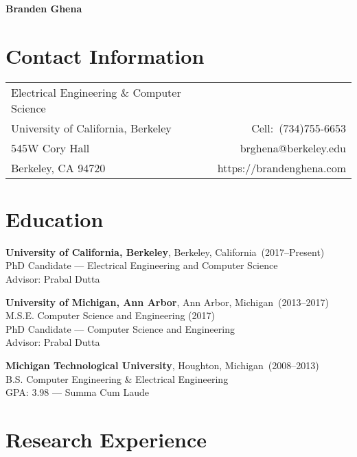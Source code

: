 \documentclass{article}
\begin{document}

\nocite{*}

\begin{center}
    \Huge{\bf{Branden Ghena}}
\end{center}

\section*{Contact Information}

\begin{table}[H]
\centering
\vspace*{-16pt}
\begin{tabularx}{\linewidth}{@{} X r @{}}
    {Electrical Engineering \& Computer Science}     & {} \\
    {University of California, Berkeley}   & {Cell:~(734)755-6653} \\
    {545W Cory Hall} & {brghena@berkeley.edu} \\
    {Berkeley, CA 94720} & {https://brandenghena.com} \\
\end{tabularx}
\end{table}


\section*{Education}
\vspace{-6pt}

{\bf University of California, Berkeley}, Berkeley, California~(2017--Present) \\
PhD Candidate --- Electrical Engineering and Computer Science \\
Advisor: Prabal Dutta

{\bf University of Michigan, Ann Arbor}, Ann Arbor, Michigan~(2013--2017) \\
M.S.E. Computer Science and Engineering (2017) \\
PhD Candidate --- Computer Science and Engineering \\
Advisor: Prabal Dutta

{\bf Michigan Technological University}, Houghton, Michigan~(2008--2013) \\
B.S. Computer Engineering \& Electrical Engineering \\
GPA: 3.98 --- Summa Cum Laude


\section*{Research Experience}
\vspace{-6pt}
\end{document}
